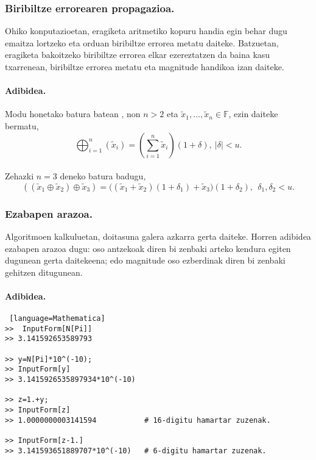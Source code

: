 \subsubsection*{Biribiltze errorearen propagazioa.}

Ohiko konputazioetan, eragiketa aritmetiko kopuru handia egin behar dugu emaitza lortzeko eta orduan biribiltze errorea metatu daiteke. Batzuetan, eragiketa bakoitzeko biribiltze errorea elkar ezereztatzen da baina kasu txarrenean, biribiltze errorea metatu eta magnitude handikoa izan daiteke.   

\paragraph*{\textbf{Adibidea}.} 
Modu honetako batura batean , non $n>2$ eta $\tilde x_1,\dots,\tilde x_n \in \mathbb{F}$,  ezin daiteke bermatu,  
\begin{equation*}
\bigoplus_{i=1}^{n}(\tilde x_i)=(\sum\limits_{i=1}^{n} \tilde x_i)(1+\delta), \ |\delta|<u.
\end{equation*}

\paragraph*{}Zehazki $n=3$ deneko batura badugu,
\begin{equation*}
((\tilde x_1 \oplus \tilde x_2) \oplus \tilde x_3)  = 
  \big((\tilde x_1 + \tilde x_2)(1+\delta_1)
  +\tilde x_3 \big) (1+\delta_2), \ \ \delta_1,\delta_2<u.
\end{equation*}

\subsubsection*{Ezabapen arazoa.}

Algoritmoen kalkuluetan, doitasuna galera azkarra gerta daiteke. Horren adibidea ezabapen arazoa dugu: oso antzekoak diren bi zenbaki arteko kendura egiten dugunean gerta daitekeena; edo magnitude oso ezberdinak diren bi zenbaki gehitzen ditugunean. 

\paragraph*{\textbf{Adibidea}.}

\begin{lstlisting} [language=Mathematica]
>>  InputForm[N[Pi]]
>> 3.141592653589793

>> y=N[Pi]*10^(-10);
>> InputForm[y]
>> 3.1415926535897934*10^(-10)

>> z=1.+y;
>> InputForm[z]
>> 1.0000000003141594           # 16-digitu hamartar zuzenak.

>> InputForm[z-1.]
>> 3.141593651889707*10^(-10)   # 6-digitu hamartar zuzenak.

\end{lstlisting}
 
